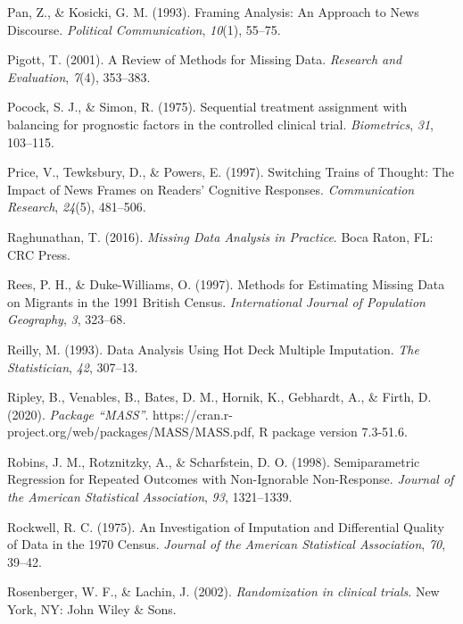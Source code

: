 \documentclass[12pt,econ]{sources/authesis}
\begin{document}
\leavevmode\hypertarget{ref-pan_framing_1993}{}%
Pan, Z., \& Kosicki, G. M. (1993). Framing Analysis: An Approach to News Discourse. \emph{Political Communication}, \emph{10}(1), 55--75.

\leavevmode\hypertarget{ref-pigott_review_2001}{}%
Pigott, T. (2001). A Review of Methods for Missing Data. \emph{Research and Evaluation}, \emph{7}(4), 353--383.

\leavevmode\hypertarget{ref-pocock_1975_sequential}{}%
Pocock, S. J., \& Simon, R. (1975). Sequential treatment assignment with balancing for prognostic factors in the controlled clinical trial. \emph{Biometrics}, \emph{31}, 103--115.

\leavevmode\hypertarget{ref-price_switching_1997}{}%
Price, V., Tewksbury, D., \& Powers, E. (1997). Switching Trains of Thought: The Impact of News Frames on Readers' Cognitive Responses. \emph{Communication Research}, \emph{24}(5), 481--506.

\leavevmode\hypertarget{ref-raghunathan_2016_missing}{}%
Raghunathan, T. (2016). \emph{Missing Data Analysis in Practice}. Boca Raton, FL: CRC Press.

\leavevmode\hypertarget{ref-rees_1997_methods}{}%
Rees, P. H., \& Duke-Williams, O. (1997). Methods for Estimating Missing Data on Migrants in the 1991 British Census. \emph{International Journal of Population Geography}, \emph{3}, 323--68.

\leavevmode\hypertarget{ref-reilly_1993_data}{}%
Reilly, M. (1993). Data Analysis Using Hot Deck Multiple Imputation. \emph{The Statistician}, \emph{42}, 307--13.

\leavevmode\hypertarget{ref-ripley_2020_package}{}%
Ripley, B., Venables, B., Bates, D. M., Hornik, K., Gebhardt, A., \& Firth, D. (2020). \emph{Package ``MASS''}. https://cran.r-project.org/web/packages/MASS/MASS.pdf, R package version 7.3-51.6.

\leavevmode\hypertarget{ref-robins_1998_semiparametric}{}%
Robins, J. M., Rotznitzky, A., \& Scharfstein, D. O. (1998). Semiparametric Regression for Repeated Outcomes with Non-Ignorable Non-Response. \emph{Journal of the American Statistical Association}, \emph{93}, 1321--1339.

\leavevmode\hypertarget{ref-rockwell_1975_investigation}{}%
Rockwell, R. C. (1975). An Investigation of Imputation and Differential Quality of Data in the 1970 Census. \emph{Journal of the American Statistical Association}, \emph{70}, 39--42.

\leavevmode\hypertarget{ref-rosenberger_2002_randomization}{}%
Rosenberger, W. F., \& Lachin, J. (2002). \emph{Randomization in clinical trials}. New York, NY: John Wiley \& Sons.
\end{document}
